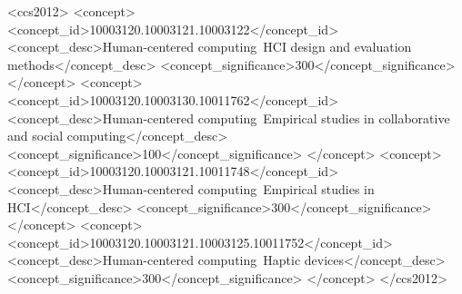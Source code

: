 \documentclass[acmsmall]{acmart}
\begin{document}

\begin{CCSXML}
<ccs2012>
   <concept>
       <concept_id>10003120.10003121.10003122</concept_id>
       <concept_desc>Human-centered computing~HCI design and evaluation methods</concept_desc>
       <concept_significance>300</concept_significance>
       </concept>
   <concept>
       <concept_id>10003120.10003130.10011762</concept_id>
       <concept_desc>Human-centered computing~Empirical studies in collaborative and social computing</concept_desc>
       <concept_significance>100</concept_significance>
       </concept>
   <concept>
       <concept_id>10003120.10003121.10011748</concept_id>
       <concept_desc>Human-centered computing~Empirical studies in HCI</concept_desc>
       <concept_significance>300</concept_significance>
       </concept>
   <concept>
       <concept_id>10003120.10003121.10003125.10011752</concept_id>
       <concept_desc>Human-centered computing~Haptic devices</concept_desc>
       <concept_significance>300</concept_significance>
       </concept>
 </ccs2012>
\end{CCSXML}





\maketitle
\end{document}
